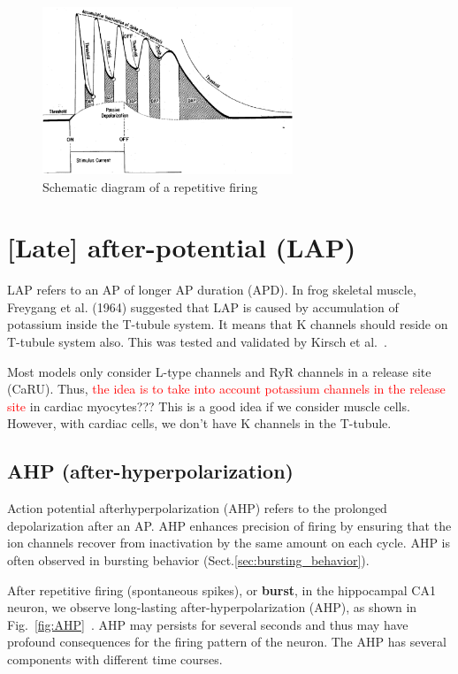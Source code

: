 \begin{figure}[hbt]
  \centerline{\includegraphics[height=5cm,
    angle=0]{./images/repetitive_firing.eps}}
\caption{Schematic diagram of a repetitive firing }
\label{fig:repetitive_firing}
\end{figure}



\section{[Late] after-potential (LAP)}
\label{sec:late-after-potential}

LAP refers to an AP of longer AP duration (APD).  In frog skeletal
muscle, Freygang et al. (1964) suggested that LAP is caused by
accumulation of potassium inside the T-tubule system. It means that K
channels should reside on T-tubule system also. This was tested and
validated by Kirsch et al.~\citep{kirsch1977drtt}.

Most models only consider L-type channels and RyR channels in a
release site (CaRU). Thus, \textcolor{red}{the idea is to take into
  account potassium channels in the release site} in cardiac
myocytes??? This is a good idea if we consider muscle cells. However,
with cardiac cells, we don't have K channels in the T-tubule. 


\subsection{AHP (after-hyperpolarization)}
\label{sec:ahp-after-hyperp}

Action potential afterhyperpolarization (AHP) refers to the prolonged
depolarization after an AP. AHP enhances precision of firing by ensuring that
the ion channels recover from inactivation by the same amount on each cycle. 
AHP is often observed in bursting behavior (Sect.\ref{sec:bursting_behavior}).

After repetitive firing (spontaneous  spikes), or {\bf burst}, in the
hippocampal CA1 neuron, we observe long-lasting after-hyperpolarization (AHP),
as shown in Fig.~\ref{fig:AHP}~\citep{hotson1980ahp}.
AHP may persists for several seconds and thus may have profound consequences for
the firing pattern of the neuron. The AHP has several components with different
time courses.  

